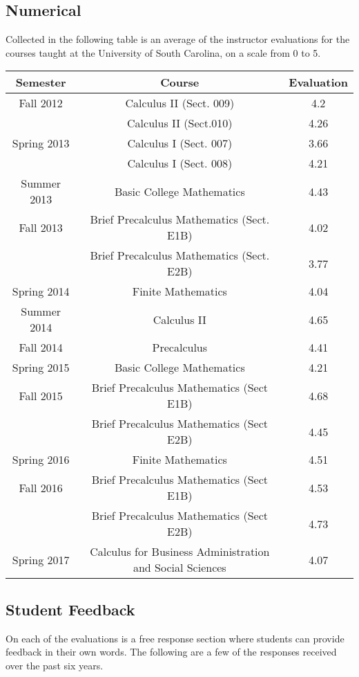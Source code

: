 \documentclass[teaching.portfolio.tex]{subfiles}
\begin{document}
\subsection{Numerical}
Collected in the following table is an average of the instructor evaluations for the courses taught at the University of South Carolina, on a scale from 0 to 5.

\begin{tabular}{|c|c|c|}
  \hline
  \textbf{Semester} & \textbf{Course} & \textbf{Evaluation}\\
  \hline
  Fall 2012 & Calculus II (Sect. 009) & 4.2\\
  & Calculus II (Sect.010) & 4.26\\
  \hline
  Spring 2013 & Calculus I (Sect. 007) & 3.66\\
  & Calculus I (Sect. 008) & 4.21\\
  \hline
  Summer 2013 & Basic College Mathematics & 4.43\\
  \hline
  Fall 2013 & Brief Precalculus Mathematics (Sect. E1B) & 4.02\\
  & Brief Precalculus Mathematics (Sect. E2B) & 3.77\\
  \hline
  Spring 2014 & Finite Mathematics & 4.04\\
  \hline
  Summer 2014 & Calculus II & 4.65\\
  \hline
  Fall 2014 & Precalculus & 4.41 \\
  \hline
  Spring 2015 & Basic College Mathematics & 4.21\\
  \hline
  Fall 2015 & Brief Precalculus Mathematics (Sect E1B) & 4.68\\
  & Brief Precalculus Mathematics (Sect E2B) & 4.45\\
  \hline
  Spring 2016 & Finite Mathematics & 4.51\\
  \hline
  Fall 2016 & Brief Precalculus Mathematics (Sect E1B) & 4.53\\
  & Brief Precalculus Mathematics (Sect E2B) & 4.73\\
  \hline
  Spring 2017 & Calculus for Business Administration and Social Sciences & 4.07\\
  \hline
\end{tabular}
\subsection{Student Feedback}
On each of the evaluations is a free response section where students can provide feedback in their own words.
The following are a few of the responses received over the past six years.\\
\end{document}
